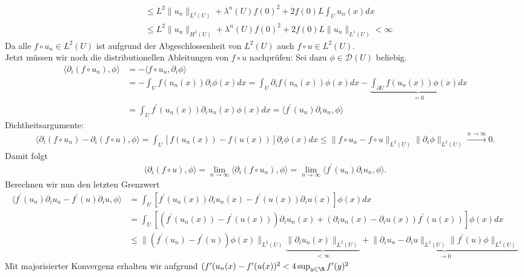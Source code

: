 \begin{solution}
\begin{align*}
  &\leq L^2\|u_n\|_{L^2(U)} + \lambda^n(U)f(0)^2 + 2f(0) L \int_U u_n(x)dx \\
  &\leq L^2\|u_n\|_{H^1(U)} + \lambda^n(U)f(0)^2 + 2f(0) L \|u_n\|_{L^1(U)} < \infty
\end{align*}
Da alle $f\circ u_n \in L^2(U)$ ist aufgrund der Abgeschlossenheit von $L^2(U)$
auch $f\circ u \in L^2(U)$. \\
Jetzt müssen wir noch die distributionellen Ableitungen von $f\circ u$ nachprüfen:
Sei dazu $\phi \in \mathcal{D}(U)$ beliebig.
\begin{align*}
  \langle \partial_i(f\circ u_n), \phi \rangle &= - \langle f\circ u_n, \partial_i \phi \rangle \\
  &= -\int_U f(u_n(x)) \partial_i\phi(x) dx = \int_U \partial_i f(u_n(x)) \phi(x) dx
  - \underbrace{\int_{\partial U} f(u_n(x))\phi(x) dx}_{=0} \\
  &= \int_U f^\prime(u_n(x)) \partial_i u_n(x) \phi(x) dx
  = \langle f^{\prime}(u_n)\partial_i u_n, \phi \rangle
\end{align*}
Dichtheitsargumente:
\begin{align*}
  \langle \partial_i(f\circ u_n) - \partial_i(f\circ u), \phi \rangle
  = \int_U[f(u_n(x)) - f(u(x))]\partial_i\phi(x) dx \leq
  \|f\circ u_n - f\circ u\|_{L^2(U)}\|\partial_i \phi\|_{L^2(U)} \xrightarrow{n \to \infty} 0.
\end{align*}
Damit folgt
\begin{align*}
  \langle \partial_i (f \circ u), \phi \rangle
  = \lim_{n \to \infty}\langle \partial_i (f \circ u_n), \phi \rangle
  = \lim_{n \to \infty}\langle f^{\prime}(u_n)\partial_i u_n, \phi \rangle.
\end{align*}
Berechnen wir nun den letzten Grenzwert
\begin{align*}
  \langle f^{\prime}(u_n)\partial_i u_n - f^{\prime}(u)\partial_i u, \phi \rangle &=
  \int_U [f^{\prime}(u_n(x))\partial_i u_n(x) - f^{\prime}(u(x))\partial_i u(x)] \phi(x) dx \\
  &= \int_U [(f^{\prime}(u_n(x)) -f^{\prime}(u(x)))\partial_i u_n(x)
  + (\partial_i u_n(x) - \partial_i u(x))f^{\prime}(u(x))]\phi(x) dx \\
  &\leq \|(f^{\prime}(u_n) - f^{\prime}(u))\phi(x)\|_{L^2(U)}
  \underbrace{\|\partial_i u_n(x)\|_{L^2(U)}}_{< \infty}
   + \underbrace{\|\partial_i u_n - \partial_i u\|_{L^2(U)}\|f^{\prime}(u)\phi\|_{L^2(U)}}_{\to 0}
\end{align*}
Mit majorisierter Konvergenz erhalten wir aufgrund
$(f^{\prime}(u_n(x) - f^{\prime}(u(x))^2 < 4\sup_{y \in \R}f^{\prime}(y)^2$

\end{solution}
